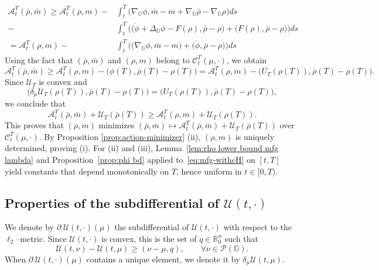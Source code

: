 \documentclass[10pt]{article}
\numberwithin{equation}{section}
\newcommand{\cA}{ \mathcal{A}}
\newcommand{\cC}{ \mathcal{C}}
\newcommand{\cP}{ \mathcal{P}}
\newcommand{\cU}{ \mathcal{U}}
\newcommand{\bG}{\mathbb G}
\newcommand{\bR}{\mathbb R}
\def\G{\mathbb{G}}
\begin{document}
%
 \begin{align*}
 \cA_t^T(\bar \rho,  \bar m)  \geq   \cA_t^T(\rho,  m)
 -&\int_t^T \big(\nabla_{\G}\phi, \bar m-m+\nabla_\bG \bar \rho-\nabla_\bG \rho\big) ds\\
  -& \int_t^T\Big(\big(\dot \phi +\Delta_\G \phi-F(\rho) , \bar \rho -\rho\big)+ \big(F(\rho), \bar \rho-\rho\big) \Big) ds\\
 = \cA_t^T(\rho, m) -&  \int_t^T\Big( \big(\nabla_{\G}\phi, \bar m-m\big) +
 \big(\dot \phi, \bar \rho -\rho\big)\Big) ds
 \end{align*}
Using the fact that $(\bar \rho, \bar m)$ and $(\rho, m)$ belong to $\cC_t^T(\mu, \cdot)$, we obtain 
\[
\cA_t^T(\bar \rho,  \bar m)  \geq  \cA_t^T(\rho, m) - \big(\phi(T), \bar \rho(T)-\rho(T)\big) = \cA_t^T(\rho, m)- \big(U_T(\rho(T)), \bar \rho(T)-\rho(T) \big).
\]
%
Since $\cU_T$ is convex and 
\[
\big(\delta_\mu \cU_T(\rho(T)), \bar \rho(T)-\rho(T) \big)=  \big(U_T(\rho(T)), \bar \rho(T)-\rho(T) \big),
\]
we conclude that 
\[
 \cA_t^T(\bar \rho,  \bar m)+\cU_T(\bar \rho(T))  \geq \cA_t^T( \rho,  m)+\cU_T( \rho(T)).
\]
This proves that $(\rho, m)$ minimizes $(\bar \rho, \bar m) \mapsto \cA_t^T(\bar \rho, \bar m)+\cU_T(\bar \rho(T))$ over $\cC_t^T(\mu, \cdot)$. By Proposition \ref{prop:action-minimizer} (ii), $(\rho, m)$ is uniquely determined, proving (i). For (ii) and (iii), Lemma~\ref{lem:rho lower bound mfg lambda} and Proposition~\ref{prop:phi bd} applied to~\eqref{eq:mfg-withcH} on $[t,T]$ yield constants that depend monotonically on $T$, hence uniform in $t\in[0,T)$. \endproof

%
%


% 
%
\subsection{Properties of the subdifferential of \texorpdfstring{$\cU(t, \cdot)$}{U(t,.)}}

We denote by $\partial_\cdot \cU(t, \cdot)(\mu)$ the subdifferential of $\cU(t, \cdot)$ with respect to the $\ell_2$--metric. Since $\cU(t, \cdot)$ is convex, this is the set of $q \in \bR^n_0$ such that  
\[
\cU(t, \nu)-\cU(t, \mu) \geq (\nu-\mu, q), \qquad \forall \nu \in \cP(\bG).
\]
When $\partial_\cdot \cU(t, \cdot)(\mu)$ contains a unique element, we denote it by $\delta_{\mu} \cU (t, \mu).$ 
%
%
\end{document}
